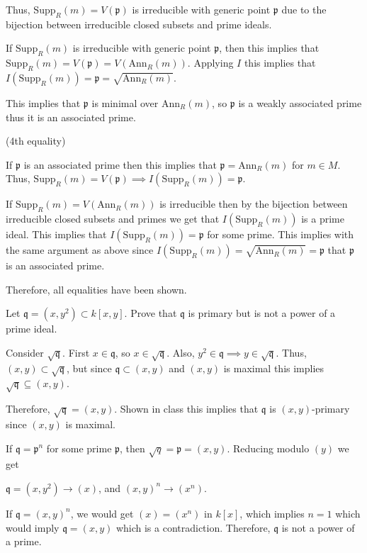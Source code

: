 \documentclass[12pt, letterpaper]{article}
\newcommand{\p}{\mathfrak{p}}
\newcommand{\Supp}{\mathrm{Supp}}
\newcommand{\Ann}{\mathrm{Ann}}
\newcommand{\mf}[1]{\mathfrak{#1}}
\begin{document}
\begin{problemproof}
    Thus, $\Supp_R(m)=V(\p)$ is irreducible with generic point $\p$ due to the bijection between irreducible closed subsets and prime ideals.

    If  $\Supp_R(m)$ is irreducible with generic point $\p$, then this implies that $\Supp_R(m)=V(\p)=V(\Ann_R(m))$. Applying $I$ this implies that $I(\Supp_R(m))=\p = \sqrt{\Ann_R(m)}$.

    This implies that $\p$ is minimal over $\Ann_R(m)$, so $\p$ is a weakly associated prime thus it is an associated prime.

    (4th equality)
    
    If $\p$ is an associated prime then this implies that $\p = \Ann_R(m)$ for $m \in M$. Thus, $\Supp_R(m)=V(\p) \implies I(\Supp_R(m))=\p$.
    
    If $\Supp_R(m)=V(\Ann_R(m))$ is irreducible then by the bijection between irreducible closed subsets and primes we get that $I(\Supp_R(m))$ is a prime ideal. This implies that $I(\Supp_R(m))=\p$ for some prime. This implies with the same argument as above since $I(\Supp_R(m))=\sqrt{\Ann_R(m)}=\p$ that
    $\p$ is an associated prime.

    Therefore, all equalities have been shown.
\end{problemproof}

\begin{problem}{}
    Let $\mf{q} = (x,y^2) \subset k[x,y]$. Prove that $\mf{q}$ is primary but is not a power of a prime ideal.
\end{problem}
\begin{problemproof}
    Consider $\sqrt{\mf{q}}$. First $x \in \mf{q}$, so $x \in \sqrt{\mf{q}}$. Also, $y^2 \in \mf{q} \implies y \in \sqrt{\mf{q}}$. Thus, $(x,y) \subset \sqrt{\mf{q}}$, but since $\mf{q} \subset (x,y)$ and $(x,y)$ is maximal this implies $\sqrt{\mf{q}} \subseteq (x,y)$.

    Therefore, $\sqrt{\mf{q}}=(x,y)$. Shown in class this implies that $\mf{q}$ is $(x,y)$-primary since $(x,y)$ is maximal.

    If $\mf{q} = \p^n$ for some prime $\p$, then $\sqrt{q}=\p=(x,y)$. Reducing modulo $(y)$ we get

    $\mf{q}=(x,y^2) \to (x)$, and $(x,y)^n \to (x^n)$.

    If $\mf{q} = (x,y)^n$, we would get $(x)=(x^n)$ in $k[x]$, which implies $n=1$ which would imply $\mf{q} = (x,y)$ which is a contradiction. Therefore, $\mf{q}$ is not a power of a prime.
\end{problemproof}
\end{document}

